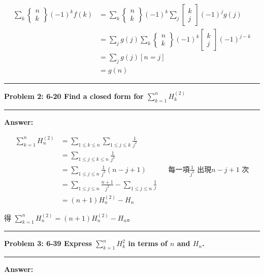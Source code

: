 \documentclass[11pt]{article}
\newcommand\question[2]{\vspace{.25in}\hrule\textbf{#1: #2}\vspace{.5em}\hrule\vspace{.10in}}
\renewcommand\part[1]{\vspace{.10in}\textbf{#1}}
\begin{document}
\begin{itemize}
\begin{align*}
			\sum_{k} \begin{Bmatrix} n \\ k \end{Bmatrix} (-1)^{k} f(k)
				&=	\sum_{k} \begin{Bmatrix} n \\ k \end{Bmatrix} (-1)^{k} 
					\sum_{j} \begin{bmatrix} k \\ j \end{bmatrix} (-1)^{j} g(j) \\
				&=	\sum_{j} g(j) \sum_{k} \begin{Bmatrix} n \\ k \end{Bmatrix} (-1)^{k}
					\begin{bmatrix} k \\ j \end{bmatrix} (-1)^{j-k} \\
				&= \sum_{j} g(j) [n = j] \\
				&= g(n)
		\end{align*}
\end{itemize}

\newpage

\question{Problem 2} {6-20 Find a closed form for $\sum_{k=1}^{n} H_k^{(2)}$
}

\part{Answer:}

\begin{align*}
\sum_{k=1}^{n} H_n^{(2)} 
	&= \sum_{1 \le k \le n} \sum_{1 \le j \le k} \frac{1}{j^2} \\
	&= \sum_{1 \le j \le k \le n} \frac{1}{j^2} \\
	&= \sum_{1 \le j \le n} \frac{1}{j^2} (n - j + 1) 
		&& \text{每一項} \frac{1}{j^2} \text{ 出現} n - j + 1 \text{ 次} \\
	&= \sum_{1 \le j \le n} \frac{n+1}{j^2} - \sum_{1 \le j \le n} \frac{1}{j} \\
	&= (n+1) H_n^{(2)} - H_n
\end{align*}

得 $\sum_{k=1}^{n} H_n^{(2)} = (n+1) H_n^{(2)} - H_n$。

\question{Problem 3} {6-39 Express $\sum_{k=1}^{n} H_k^2$ in terms of $n$ and $H_n$.
}

\part{Answer:}
\end{document}

